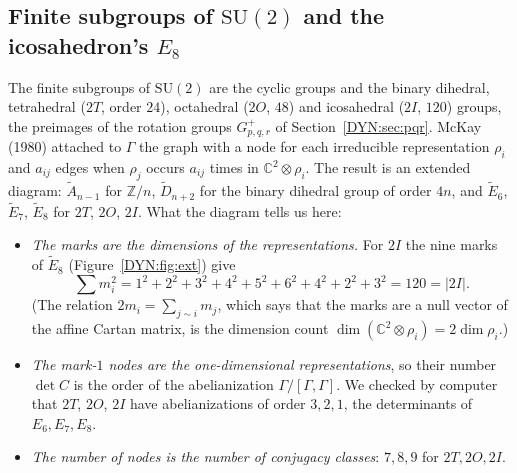 \documentclass[11pt,openany]{book}
\theoremstyle{plain}
\theoremstyle{definition}
\theoremstyle{remark}
\newcommand{\Z}{\mathbb{Z}}
\newcommand{\C}{\mathbb{C}}
\newcommand{\abs}[1]{\left\lvert #1 \right\rvert}
\begin{document}
\subsection*{Finite subgroups of $\mathrm{SU}(2)$ and the icosahedron's $E_8$}
The finite subgroups of $\mathrm{SU}(2)$ are the cyclic groups and the binary dihedral, tetrahedral
($2T$, order $24$), octahedral ($2O$, $48$) and icosahedral ($2I$, $120$) groups, the preimages of the
rotation groups $G^+_{p,q,r}$ of Section~\ref{DYN:sec:pqr}. McKay (1980) attached to $\Gamma$ the graph with
a node for each irreducible representation $\rho_i$ and $a_{ij}$ edges when $\rho_j$ occurs $a_{ij}$ times in
$\C^2\otimes\rho_i$. The result is an extended diagram: $\tilde A_{n-1}$ for $\Z/n$, $\tilde D_{n+2}$ for the
binary dihedral group of order $4n$, and $\tilde E_6$, $\tilde E_7$, $\tilde E_8$ for $2T$, $2O$, $2I$. What
the diagram tells us here:
\begin{itemize}
\item \emph{The marks are the dimensions of the representations.} For $2I$ the nine marks of
  $\tilde E_8$ (Figure~\ref{DYN:fig:ext}) give
  \[
    \textstyle\sum m_i^2=1^2+2^2+3^2+4^2+5^2+6^2+4^2+2^2+3^2=120=\abs{2I}.
  \]
  (The relation
  $2m_i=\sum_{j\sim i}m_j$, which says that the marks are a null vector of the affine Cartan matrix, is the
  dimension count $\dim(\C^2\otimes\rho_i)=2\dim\rho_i$.)
\item \emph{The mark-$1$ nodes are the one-dimensional representations}, so their number $\det C$ is the
  order of the abelianization $\Gamma/[\Gamma,\Gamma]$. We checked by computer that $2T$, $2O$, $2I$ have abelianizations
  of order $3,2,1$, the determinants of $E_6,E_7,E_8$.
\item \emph{The number of nodes is the number of conjugacy classes}: $7,8,9$ for $2T,2O,2I$.
\end{itemize}
\end{document}
